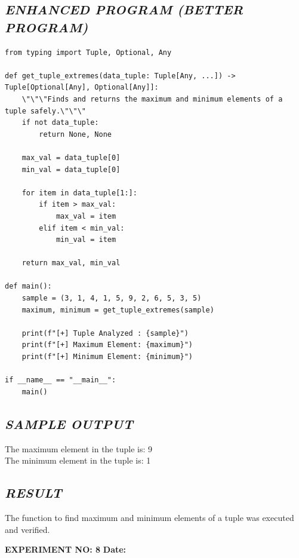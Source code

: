 \documentclass[11pt,a4paper]{article}
\begin{document}
\subsection*{\textit{ENHANCED PROGRAM (BETTER PROGRAM)}}
\begin{lstlisting}[style=pythonstyle]
from typing import Tuple, Optional, Any

def get_tuple_extremes(data_tuple: Tuple[Any, ...]) -> Tuple[Optional[Any], Optional[Any]]:
    \"\"\"Finds and returns the maximum and minimum elements of a tuple safely.\"\"\"
    if not data_tuple:
        return None, None
    
    max_val = data_tuple[0]
    min_val = data_tuple[0]
    
    for item in data_tuple[1:]:
        if item > max_val:
            max_val = item
        elif item < min_val:
            min_val = item
            
    return max_val, min_val

def main():
    sample = (3, 1, 4, 1, 5, 9, 2, 6, 5, 3, 5)
    maximum, minimum = get_tuple_extremes(sample)
    
    print(f"[+] Tuple Analyzed : {sample}")
    print(f"[+] Maximum Element: {maximum}")
    print(f"[+] Minimum Element: {minimum}")

if __name__ == "__main__":
    main()
\end{lstlisting}

\subsection*{\textit{SAMPLE OUTPUT}}
\begin{tcolorbox}[colback=black!85,colframe=navyblue,title=\textbf{Terminal Output},coltitle=white,fonttitle=\bfseries\small]
\small\ttfamily\color{green!30!white}
The maximum element in the tuple is: 9\\
The minimum element in the tuple is: 1
\end{tcolorbox}

\subsection*{\textit{RESULT}}
The function to find maximum and minimum elements of a tuple was executed and verified.

\newpage

\noindent
\textbf{\large EXPERIMENT NO: 8} \hfill \textbf{\large Date: \underline{\hspace{3cm}}}
\end{document}

